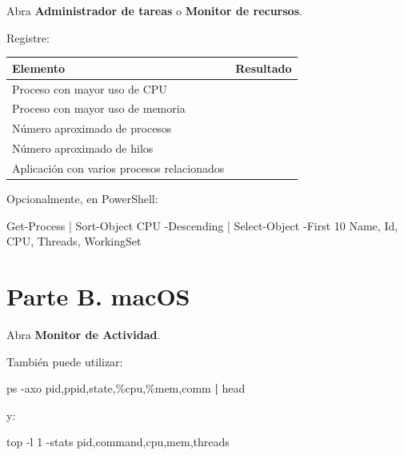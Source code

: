 \documentclass[
  spanish,
  letterpaper,
]{scrbook}
\newenvironment{Shaded}{\begin{snugshade}}{\end{snugshade}}
\newcommand{\AttributeTok}[1]{\textcolor[rgb]{0.40,0.45,0.13}{#1}}
\newcommand{\DecValTok}[1]{\textcolor[rgb]{0.68,0.00,0.00}{#1}}
\newcommand{\ExtensionTok}[1]{\textcolor[rgb]{0.00,0.23,0.31}{#1}}
\newcommand{\FunctionTok}[1]{\textcolor[rgb]{0.28,0.35,0.67}{#1}}
\newcommand{\KeywordTok}[1]{\textcolor[rgb]{0.00,0.23,0.31}{\textbf{#1}}}
\newcommand{\NormalTok}[1]{\textcolor[rgb]{0.00,0.23,0.31}{#1}}
\newcommand{\OperatorTok}[1]{\textcolor[rgb]{0.37,0.37,0.37}{#1}}
\newcounter{none} %
\begin{document}
Abra \textbf{Administrador de tareas} o \textbf{Monitor de recursos}.

Registre:

{\def\LTcaptype{none} %
\begin{longtable}[]{@{}ll@{}}
\toprule\noalign{}
Elemento & Resultado \\
\midrule\noalign{}
\endhead
\bottomrule\noalign{}
\endlastfoot
Proceso con mayor uso de CPU & \\
Proceso con mayor uso de memoria & \\
Número aproximado de procesos & \\
Número aproximado de hilos & \\
Aplicación con varios procesos relacionados & \\
\end{longtable}
}

Opcionalmente, en PowerShell:

\begin{Shaded}
\begin{Highlighting}[]
\FunctionTok{Get{-}Process} \OperatorTok{|}
  \FunctionTok{Sort{-}Object}\NormalTok{ CPU }\OperatorTok{{-}}\NormalTok{Descending }\OperatorTok{|}
  \FunctionTok{Select{-}Object} \OperatorTok{{-}}\NormalTok{First }\DecValTok{10}\NormalTok{ Name}\OperatorTok{,}\NormalTok{ Id}\OperatorTok{,}\NormalTok{ CPU}\OperatorTok{,}\NormalTok{ Threads}\OperatorTok{,}\NormalTok{ WorkingSet}
\end{Highlighting}
\end{Shaded}

\section{Parte B. macOS}\label{parte-b.-macos}

Abra \textbf{Monitor de Actividad}.

También puede utilizar:

\begin{Shaded}
\begin{Highlighting}[]
\FunctionTok{ps} \AttributeTok{{-}axo}\NormalTok{ pid,ppid,state,\%cpu,\%mem,comm }\KeywordTok{|} \FunctionTok{head}
\end{Highlighting}
\end{Shaded}

y:

\begin{Shaded}
\begin{Highlighting}[]
\ExtensionTok{top} \AttributeTok{{-}l}\NormalTok{ 1 }\AttributeTok{{-}stats}\NormalTok{ pid,command,cpu,mem,threads}
\end{Highlighting}
\end{Shaded}
\end{document}
